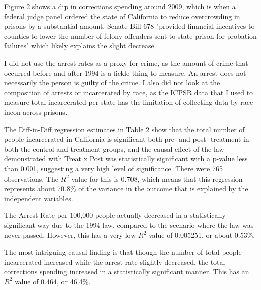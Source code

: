 \documentclass[12pt]{article}
\begin{document}
    Figure 2 shows a dip in corrections spending around 2009, which is when a federal judge panel ordered the state of California to reduce overcrowding in prisons by a substantial amount. Senate Bill 678 "provided financial incentives to counties to lower the number of felony offenders sent to state prison for probation failures" \parencite{PPIC_CriminalJusticeShifts} which likely explains the slight decrease. 

    I did not use the arrest rates as a proxy for crime, as the amount of crime that occurred before and after 1994 is a fickle thing to measure. An arrest does not necessarily the person is guilty of the crime. I also did not look at the composition of arrests or incarcerated by race, as the ICPSR data that I used to measure total incarcerated per state has the limitation of collecting data by race incon across prisons. 
    
    The Diff-in-Diff regression estimates in Table 2 show that the total number of people incarcerated in California is significant both pre- and post- treatment in both the control and treatment groups, and the causal effect of the law demonstrated with Treat x Post was statistically significant with a p-value less than 0.001, suggesting a very high level of significance. There were 765 observations. The $R^2$ value for this is 0.708, which means that this regression represents about 70.8\% of the variance in the outcome that is explained by the independent variables.
    
    The Arrest Rate per 100,000 people actually decreased in a statistically significant way due to the 1994 law, compared to the scenario where the law was never passed. However, this has a very low $R^2$ value of 0.005251, or about 0.53\%.

    The most intriguing causal finding is that though the number of total people incarcerated increased while the arrest rate slightly decreased, the total corrections spending increased in a statistically significant manner. This has an $R^2$ value of 0.464, or 46.4\%. 
\end{document}
